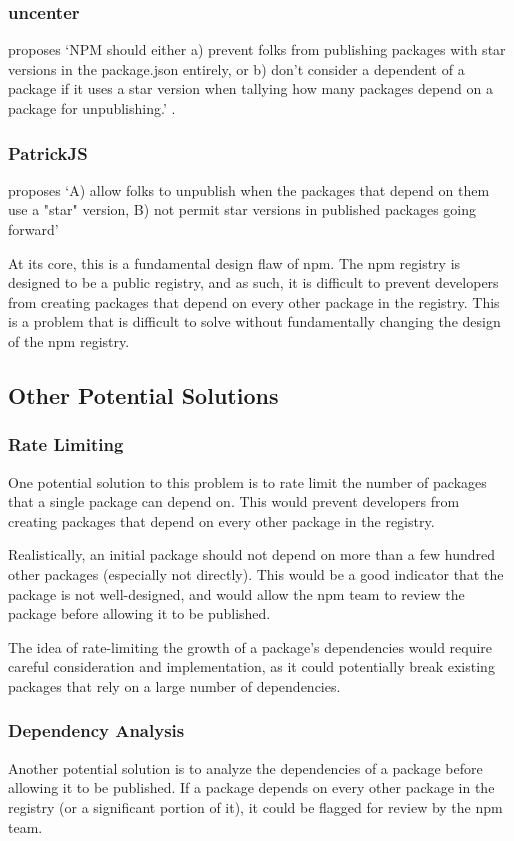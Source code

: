 \documentclass[acmsmall]{acmart}
\begin{document}
\subsubsection{uncenter} proposes `NPM should either a) prevent folks from
publishing packages with star versions in the package.json entirely, or b) don't
consider a dependent of a package if it uses a star version when tallying how
many packages depend on a package for unpublishing.'
\cite{uncenter-blog-everything}.

\subsubsection{PatrickJS} proposes `A) allow folks to unpublish when the
packages that depend on them use a "star" version, B) not permit star versions
in published packages going forward' \cite{bleepingcomputer-everything}

At its core, this is a fundamental design flaw of npm. The npm registry is
designed to be a public registry, and as such, it is difficult to prevent
developers from creating packages that depend on every other package in the
registry. This is a problem that is difficult to solve without fundamentally
changing the design of the npm registry.

\subsection{Other Potential Solutions}
\subsubsection{Rate Limiting}
One potential solution to this problem is to rate limit the number of packages
that a single package can depend on. This would prevent developers from creating
packages that depend on every other package in the registry.

Realistically, an initial package should not depend on more than a few hundred
other packages (especially not directly). This would be a good indicator that
the package is not well-designed, and would allow the npm team to review the
package before allowing it to be published.

The idea of rate-limiting the growth of a package's dependencies would require
careful consideration and implementation, as it could potentially break existing
packages that rely on a large number of dependencies.

\subsubsection{Dependency Analysis}
Another potential solution is to analyze the dependencies of a package before
allowing it to be published. If a package depends on every other package in the
registry (or a significant portion of it), it could be flagged for review by the
npm team.
\end{document}

